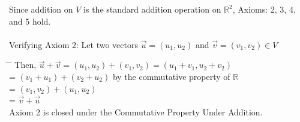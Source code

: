 \documentclass[addpoints]{exam}
\begin{document}
\begin{tcolorbox}[colback=cyan!5!white,colframe=cyan!75!black,title=1. d) Solution]
Since addition on $V$ is the standard addition operation on $\mathbb{R}^2$, Axioms: 2, 3, 4, and 5 hold.\\ \\
Verifying Axiom 2: \space \space \space Let two vectors $\vec{u} = (u_1,u_2)$ and $\vec{v}=(v_1,v_2) \in V$      
\begin{tabbing}
\hspace*{10em}\= \hspace*{2em} \= \kill %
    \>   Then, $\vec{u}+\vec{v} = (u_1, u_2) +(v_1,v_2) = (u_1+v_1, u_2+v_2)$ \\
    \> \hspace{5.4em} =  $(v_1+u_1) + (v_2+u_2)$ by the commutative property of $\mathbb{R}$\\
    \> \hspace{5.4em} = $(v_1,v_2)+(u_1,u_2)$\\
    \> \hspace{5.4em} = $\vec{v}+\vec{u}$\\
    Axiom 2 is closed under the Commutative Property Under Addition.
\end{tabbing}
\end{tcolorbox}
\end{document}

